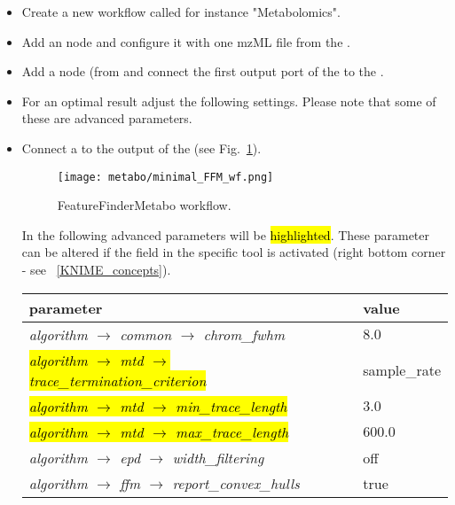\begin{itemize}
\item
Create a new workflow called for instance "Metabolomics".
\item
Add an  node and configure it with one mzML file from the .
\item
Add a  node (from  and connect the first output port of the  to the .
\item
For an optimal result adjust the following settings.
Please note that some of these are advanced parameters.
\item
Connect a  to the output of the  (see Fig.~\ref{fig:minimal_FFM_wf}).
\begin{figure}[!htbp]
  \centering
  \texttt{[image: metabo/minimal\_FFM\_wf.png]}
  \caption{FeatureFinderMetabo workflow.}
  \label{fig:minimal_FFM_wf}
\end{figure}

In the following advanced parameters will be \hl{highlighted}. These parameter can be altered if the  field in the specific tool is activated (right bottom corner - see ~\ref{KNIME_concepts}). 

\begin{center}
\begin{tabular}{l|l}
\textbf{parameter} & \textbf{value} \\ \hline
\textit{algorithm $\rightarrow$ common $\rightarrow$ chrom\_fwhm} & $8.0$ \\
\hl{\textit{algorithm $\rightarrow$ mtd $\rightarrow$ trace\_termination\_criterion}} & sample\_rate \\
\hl{\textit{algorithm $\rightarrow$ mtd $\rightarrow$ min\_trace\_length}} & $3.0$ \\
\hl{\textit{algorithm $\rightarrow$ mtd $\rightarrow$ max\_trace\_length}} & $600.0$\\
\textit{algorithm $\rightarrow$ epd $\rightarrow$ width\_filtering} & off \\
\textit{algorithm $\rightarrow$ ffm $\rightarrow$ report\_convex\_hulls} & true
\end{tabular}
\end{center}
\end{itemize}

